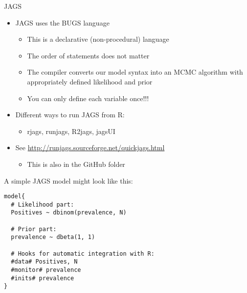 \documentclass[
  ignorenonframetext,
  aspectratio=169,
]{beamer}
\providecommand{\tightlist}{%
  \setlength{\itemsep}{0pt}\setlength{\parskip}{0pt}}
\begin{document}
\begin{frame}{JAGS}
\protect\hypertarget{jags}{}
\begin{itemize}
\item
  JAGS uses the BUGS language

  \begin{itemize}
  \tightlist
  \item
    This is a declarative (non-procedural) language
  \item
    The order of statements does not matter
  \item
    The compiler converts our model syntax into an MCMC algorithm with
    appropriately defined likelihood and prior
  \item
    You can only define each variable once!!!
  \end{itemize}
\end{itemize}

\pause

\begin{itemize}
\item
  Different ways to run JAGS from R:

  \begin{itemize}
  \tightlist
  \item
    rjags, runjags, R2jags, jagsUI
  \end{itemize}
\item
  See \url{http://runjags.sourceforge.net/quickjags.html}

  \begin{itemize}
  \tightlist
  \item
    This is also in the GitHub folder
  \end{itemize}
\end{itemize}
\end{frame}

\begin{frame}[fragile]
A simple JAGS model might look like this:

\scriptsize

\begin{verbatim}
model{
  # Likelihood part:
  Positives ~ dbinom(prevalence, N)
  
  # Prior part:
  prevalence ~ dbeta(1, 1)
  
  # Hooks for automatic integration with R:
  #data# Positives, N
  #monitor# prevalence
  #inits# prevalence
}
\end{verbatim}

\normalsize
\end{frame}
\end{document}
